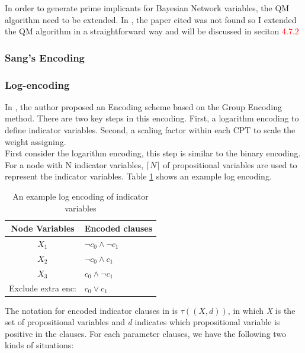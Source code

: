         In order to generate prime implicants for Bayesian Network variables, the QM algorithm need to be extended. In \cite{2006-enc3}, the paper cited was not found so I extended the QM algorithm in a straightforward way and will be discussed in seciton \textcolor{red}{4.7.2}
        
        \subsubsection{Sang's Encoding}
        \cite{Sang:2005:PBI:1619332.1619409}
        \subsubsection{Log-encoding}
        \cite{2016-logencoding}
        In \cite{2016-logencoding}, the author proposed an Encoding scheme based on the Group Encoding method. There are two key steps in this encoding. First, a logarithm encoding to define indicator variables. Second, a scaling factor within each CPT to scale the weight assigning.\\
        
        \noindent First consider the logarithm encoding, this step is similar to the binary encoding. For a node with N indicator variables, $\lceil N \rceil$ of propositional variables are used to represent the indicator variables. Table \ref{tab:log_example} shows an example log encoding.\\
        \begin{table}[]
            \centering
            \begin{tabular}{c l}
                \hline
                \hline
                Node Variables	&	Encoded clauses	\\
                \hline
                $X_{1}$	&	$\neg c_{0} \wedge \neg c_{1}$	\\
                $X_{2}$	&	$\neg c_{0} \wedge c_{1}$	\\
                $X_{3}$	&	$ c_{0} \wedge \neg c_{1}$	\\
                \hline
                Exclude extra enc: & $c_{0} \vee  c_{1}$\\
                \hline
                \hline
            \end{tabular}
            \caption{An example log encoding of indicator variables}
            \label{tab:log_example}
        \end{table}
        
        \noindent The notation for encoded indicator clauses in \cite{2016-logencoding} is $\tau((X, d))$, in which \textit{X} is the set of propositional variables and \textit{d} indicates which propositional variable is positive in the clauses. For each parameter clauses, we have the following two kinds of situations:
        
